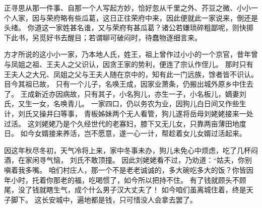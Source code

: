 正寻思从那一件事、自那一个人写起方妙，恰好忽从千里之外、芥豆之微、小小一个人家，因与荣府略有些瓜葛，这日正往荣府中来，因此便就此一家说来，倒还是头绪。
你道这一家姓甚名谁，又与荣府有甚瓜葛？诸公若嫌琐碎粗鄙呢，则快掷下此书，另觅好书去醒目；若谓聊可破闷时，待蠢物逐细言来。
\par
方才所说的这小小一家，乃本地人氏，姓王，祖上曾作过小小的一个京官，昔年曾与凤姐之祖、王夫人之父识认，因贪王家的势利，便连了宗认作侄儿。
那时只有王夫人之大兄、凤姐之父与王夫人随在京中的，知有此一门远族，馀者皆不识认。
目今其祖已故，
只有一个儿子，名唤王成，因家业萧条，仍搬出城外原乡中住去了。
王成新近亦因病故，只有其子，小名狗儿，亦生一子，小名板儿，嫡妻刘氏，又生一女，名唤青儿。
一家四口，仍以务农为业，因狗儿白日间又作些生计，刘氏又操井臼等事，
青板姊妹两个无人看管，狗儿遂将岳母刘姥姥接来一处过活。
这刘姥姥乃是个久经世代的老寡妇，膝下又无儿女，只靠两亩薄田地度日。
如今女婿接来养活，岂不愿意，遂一心一计，帮趁着女儿女婿过活起来。
\par
因这年秋尽冬初，天气冷将上来，家中冬事未办，狗儿未免心中烦虑，吃了几杯闷酒，在家闲寻气恼，
刘氏不敢顶撞。
因此刘姥姥看不过，乃劝道：“姑夫，你别嗔着我多嘴。
咱们村庄人，那一个不是老老诚诚的，多大碗吃多大的饭？你皆因年小时，托着你那老的福，吃喝惯了，如今所以把持不住。
有了钱就顾头不顾尾，没了钱就瞎生气，成个什么男子汉大丈夫了！
如今咱们虽离城住着，终是天子脚下。
这长安城中，遍地都是钱，只可惜没人会拿去罢了。
